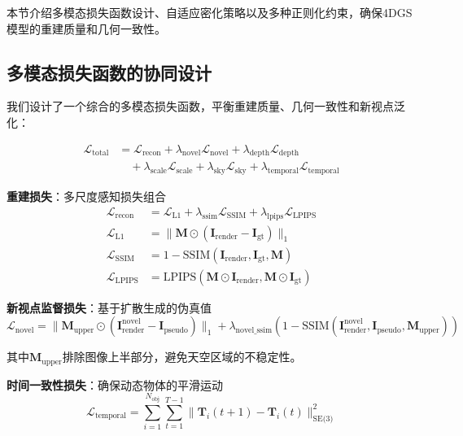 本节介绍多模态损失函数设计、自适应密化策略以及多种正则化约束，确保4DGS模型的重建质量和几何一致性。

\subsection{多模态损失函数的协同设计}

我们设计了一个综合的多模态损失函数，平衡重建质量、几何一致性和新视点泛化：

\begin{align}
\mathcal{L}_{\text{total}} &= \mathcal{L}_{\text{recon}} + \lambda_{\text{novel}} \mathcal{L}_{\text{novel}} + \lambda_{\text{depth}} \mathcal{L}_{\text{depth}} \\
&\quad + \lambda_{\text{scale}} \mathcal{L}_{\text{scale}} + \lambda_{\text{sky}} \mathcal{L}_{\text{sky}} + \lambda_{\text{temporal}} \mathcal{L}_{\text{temporal}}
\label{eq:comprehensive_loss}
\end{align}

\textbf{重建损失}：多尺度感知损失组合
\begin{align}
\mathcal{L}_{\text{recon}} &= \mathcal{L}_{\text{L1}} + \lambda_{\text{ssim}} \mathcal{L}_{\text{SSIM}} + \lambda_{\text{lpips}} \mathcal{L}_{\text{LPIPS}} \\
\mathcal{L}_{\text{L1}} &= \|\mathbf{M} \odot (\mathbf{I}_{\text{render}} - \mathbf{I}_{\text{gt}})\|_1 \\
\mathcal{L}_{\text{SSIM}} &= 1 - \text{SSIM}(\mathbf{I}_{\text{render}}, \mathbf{I}_{\text{gt}}, \mathbf{M}) \\
\mathcal{L}_{\text{LPIPS}} &= \text{LPIPS}(\mathbf{M} \odot \mathbf{I}_{\text{render}}, \mathbf{M} \odot \mathbf{I}_{\text{gt}})
\label{eq:reconstruction_loss_detailed}
\end{align}

\textbf{新视点监督损失}：基于扩散生成的伪真值
\begin{equation}
\mathcal{L}_{\text{novel}} = \|\mathbf{M}_{\text{upper}} \odot (\mathbf{I}_{\text{render}}^{\text{novel}} - \mathbf{I}_{\text{pseudo}})\|_1 + \lambda_{\text{novel\_ssim}} (1 - \text{SSIM}(\mathbf{I}_{\text{render}}^{\text{novel}}, \mathbf{I}_{\text{pseudo}}, \mathbf{M}_{\text{upper}}))
\label{eq:novel_supervision_loss}
\end{equation}

其中$\mathbf{M}_{\text{upper}}$排除图像上半部分，避免天空区域的不稳定性。

\textbf{时间一致性损失}：确保动态物体的平滑运动
\begin{equation}
\mathcal{L}_{\text{temporal}} = \sum_{i=1}^{N_{\text{obj}}} \sum_{t=1}^{T-1} \|\mathbf{T}_i(t+1) - \mathbf{T}_i(t)\|_{\text{SE(3)}}^2
\label{eq:temporal_consistency}
\end{equation}

